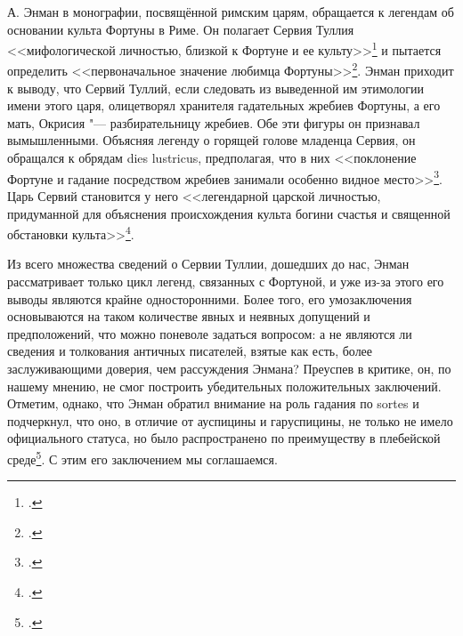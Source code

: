 

А. Энман в монографии, посвящённой римским царям, обращается к легендам об основании культа Фортуны в Риме. Он полагает Сервия Туллия <<мифологической личностью, близкой к Фортуне и ее культу>>\footcite[С. 225]{Enman1896} и пытается определить <<первоначальное значение любимца Фортуны>>\footcite[С. 228]{Enman1896}. Энман приходит к выводу, что Сервий Туллий, если следовать из выведенной им этимологии имени этого царя, олицетворял хранителя гадательных жребиев Фортуны, а его мать, Окрисия "--- разбирательницу жребиев. Обе эти фигуры он признавал вымышленными. Объясняя легенду о горящей голове младенца Сервия, он обращался к обрядам dies lustricus, предполагая, что в них <<поклонение Фортуне и гадание посредством жребиев занимали особенно видное место>>\footcite[С. 243]{Enman1896}. Царь Сервий становится у него <<легендарной царской личностью, придуманной для объяснения происхождения культа богини счастья и священной обстановки культа>>\footcite{Enman1896}.

Из всего множества сведений о Сервии Туллии, дошедших до нас, Энман рассматривает только цикл легенд, связанных с Фортуной, и уже из-за этого его выводы являются крайне односторонними. Более того, его умозаключения основываются на таком количестве явных и неявных допущений и предположений, что можно поневоле задаться вопросом: а не являются ли сведения и толкования античных писателей, взятые как есть, более заслуживающими доверия, чем рассуждения Энмана? Преуспев в критике, он, по нашему мнению, не смог построить убедительных положительных заключений. Отметим, однако, что Энман обратил внимание на роль гадания по sortes и подчеркнул, что оно, в отличие от ауспицины и гаруспицины, не только не имело официального статуса, но было распространено по преимуществу в плебейской среде\footcite[С. 229]{Enman1896}. С этим его заключением мы соглашаемся.

